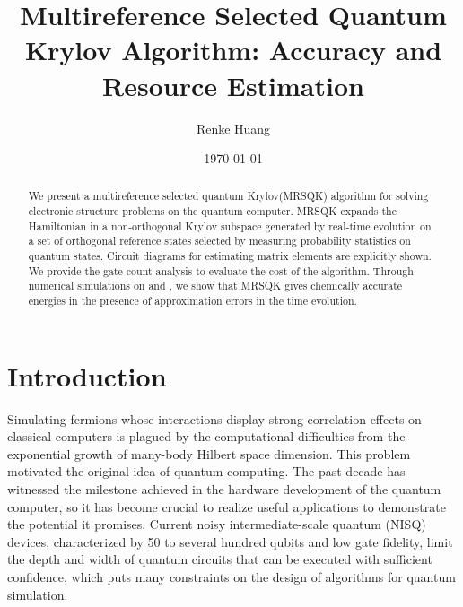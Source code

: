\documentclass[journal=jctcce,manuscript=article]{achemso}
\author{Renke Huang}
\affiliation{Department of Chemistry and Cherry Emerson Center for Scientific Computation, Emory University, Atlanta, GA, 30322}
\title{Multireference Selected Quantum Krylov Algorithm: Accuracy and Resource Estimation}
\date{\today}
\newcommand{\methodname}[0]{multireference selected quantum Krylov\xspace}
\newcommand{\methodabbr}[0]{MRSQK\xspace}
\let\oldmaketitle\maketitle
\let\maketitle\relax
\begin{document}
\oldmaketitle

\begin{abstract}
We present a \methodname (\methodabbr) algorithm for solving electronic structure problems on the quantum computer.
\methodabbr expands the Hamiltonian in a non-orthogonal Krylov subspace generated by real-time evolution on a set of orthogonal reference states selected by measuring probability statistics on quantum states.
Circuit diagrams for estimating matrix elements are explicitly shown.
We provide the gate count analysis to evaluate the cost of the algorithm.
Through numerical simulations on  and , we show that \methodabbr gives chemically accurate energies in the presence of approximation errors in the time evolution.
\end{abstract}

\section{Introduction}

Simulating fermions whose interactions display strong correlation effects on classical computers is plagued by the computational difficulties from the exponential growth of many-body Hilbert space dimension.\cite{Laughlin:2000br} 
This problem motivated the original idea of quantum computing.\cite{Feynman:1982gn,manin1980computable} 
The past decade has witnessed the milestone achieved in the hardware development of the quantum computer,\cite{Arute:2019fg} so it has become crucial to realize useful applications to demonstrate the potential it promises. Current noisy intermediate-scale quantum (NISQ) devices,\cite{Preskill:2018gt} characterized by 50 to several hundred qubits and low gate fidelity, limit the depth and width of quantum circuits that can be executed with sufficient confidence, which puts many constraints on the design of algorithms for quantum simulation.
\end{document}
